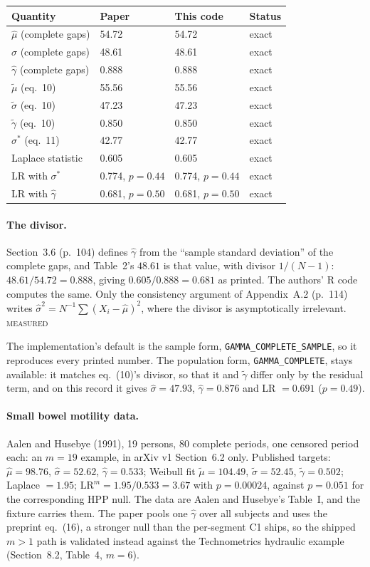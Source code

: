 \documentclass[11pt,a4paper]{article}
\newcommand{\gh}{\hat\gamma}
\newcommand{\MEASURED}{\textsc{\textcolor{green!45!black}{measured}}}
\begin{document}
\begin{center}
\small
\begin{tabular}{@{}llll@{}}
\toprule
\textbf{Quantity} & \textbf{Paper} & \textbf{This code} & \textbf{Status}\\
\midrule
$\hat\mu$ (complete gaps) & 54.72 & 54.72 & exact\\
$\hat\sigma$ (complete gaps) & 48.61 & 48.61 & exact\\
$\gh$ (complete gaps) & 0.888 & 0.888 & exact\\
$\tilde\mu$ (eq.~10) & 55.56 & 55.56 & exact\\
$\tilde\sigma$ (eq.~10) & 47.23 & 47.23 & exact\\
$\tilde\gamma$ (eq.~10) & 0.850 & 0.850 & exact\\
$\sigma^{*}$ (eq.~11) & 42.77 & 42.77 & exact\\
Laplace statistic & 0.605 & 0.605 & exact\\
LR with $\sigma^{*}$ & 0.774, $p=0.44$ & 0.774, $p=0.44$ & exact\\
LR with $\gh$ & 0.681, $p=0.50$ & 0.681, $p=0.50$ & exact\\
\bottomrule
\end{tabular}
\end{center}

\paragraph{The divisor.}
Section~3.6 (p.~104) defines $\gh$ from the \enquote{sample standard deviation} of the
complete gaps, and Table~2's $48.61$ is that value, with divisor $1/(N-1)$:
$48.61/54.72 = 0.888$, giving $0.605/0.888 = 0.681$ as printed. The authors' R code
computes the same. Only the consistency argument of Appendix~A.2 (p.~114) writes
$\hat\sigma^2 = N^{-1}\sum(X_i - \hat\mu)^2$, where the divisor is asymptotically
irrelevant. \MEASURED

The implementation's default is the sample form, \texttt{GAMMA\_COMPLETE\_SAMPLE}, so it
reproduces every printed number. The population form, \texttt{GAMMA\_COMPLETE}, stays
available: it matches eq.~(10)'s divisor, so that it and $\tilde\gamma$ differ only by the
residual term, and on this record it gives $\hat\sigma = 47.93$, $\gh = 0.876$ and
LR $= 0.691$ ($p = 0.49$).

\paragraph{Small bowel motility data.} Aalen and Husebye (1991), 19 persons, 80 complete
periods, one censored period each: an $m=19$ example, in arXiv v1 Section~6.2 only.
Published targets:
$\hat\mu = 98.76$, $\hat\sigma = 52.62$, $\gh = 0.533$; Weibull fit
$\tilde\mu = 104.49$, $\tilde\sigma = 52.45$, $\tilde\gamma = 0.502$; Laplace $=1.95$;
$\mathrm{LR}^m = 1.95/0.533 = 3.67$ with $p = 0.00024$, against $p = 0.051$ for the
corresponding HPP null. The data are Aalen and Husebye's Table~I, and the fixture carries
them. The paper pools one $\gh$ over all subjects and uses the preprint eq.~(16), a stronger
null than the per-segment C1 ships, so the shipped $m>1$ path is validated instead against
the Technometrics hydraulic example (Section~8.2, Table~4, $m=6$).
\end{document}

